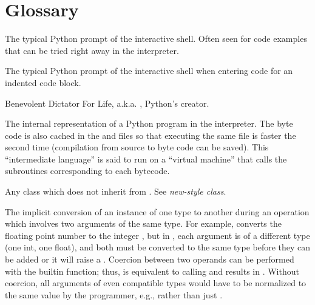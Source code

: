 \chapter{Glossary\label{glossary}}


\begin{description}


\index{>>>}
\item[\code{>\code{>}>}]
The typical Python prompt of the interactive shell.  Often seen for
code examples that can be tried right away in the interpreter.

\item[\code{.\code{.}.}]
The typical Python prompt of the interactive shell when entering code
for an indented code block.

\item[BDFL]
Benevolent Dictator For Life, a.k.a. , Python's creator.

\item[byte code]
The internal representation of a Python program in the interpreter.
The byte code is also cached in the  and 
files so that executing the same file is faster the second time
(compilation from source to byte code can be saved).  This
``intermediate language'' is said to run on a ``virtual
machine'' that calls the subroutines corresponding to each bytecode.

\item[classic class]
Any class which does not inherit from .  See
\emph{new-style class}.

\item[coercion]

The implicit conversion of an instance of one type to another during an
operation which involves two arguments of the same type.  For example,
{} converts the floating point number to the integer
{}, but in {}, each argument is of a different type (one
int, one float), and both must be converted to the same type before they can
be added or it will raise a {}.  Coercion between two
operands can be performed with the {} builtin function; thus,
{} is equivalent to calling {} and results in {}.  Without coercion,
all arguments of even compatible types would have to be normalized to the
same value by the programmer, e.g., {} rather than just
{}.


\end{description}

